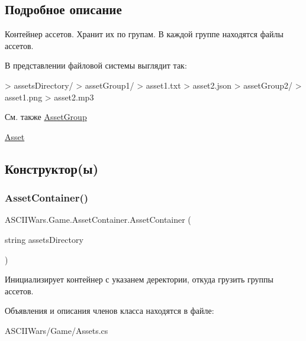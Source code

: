 \subsection{Подробное описание}
Контейнер ассетов. Хранит их по групам. В каждой группе находятся файлы ассетов. 

В представлении файловой системы выглядит так\+: 
\begin{DoxyCode}
> assetsDirectory/
>     assetGroup1/
>         asset1.txt
>         asset2.json
>     assetGroup2/
>         asset1.png
>         asset2.mp3
\end{DoxyCode}


\begin{DoxySeeAlso}{См. также}
\hyperlink{class_a_s_c_i_i_wars_1_1_game_1_1_asset_group}{Asset\+Group} 

\hyperlink{class_a_s_c_i_i_wars_1_1_game_1_1_asset}{Asset} 
\end{DoxySeeAlso}


\subsection{Конструктор(ы)}
\hypertarget{class_a_s_c_i_i_wars_1_1_game_1_1_asset_container_afb55a3f711d67504b677fc2bc38718cc}{}\label{class_a_s_c_i_i_wars_1_1_game_1_1_asset_container_afb55a3f711d67504b677fc2bc38718cc} 
\subsubsection{\texorpdfstring{Asset\+Container()}{AssetContainer()}}
{\footnotesize\ttfamily A\+S\+C\+I\+I\+Wars.\+Game.\+Asset\+Container.\+Asset\+Container (\begin{DoxyParamCaption}\item[{string}]{assets\+Directory }\end{DoxyParamCaption})\hspace{0.3cm}{\ttfamily [inline]}}

Инициализирует контейнер с указанем деректории, откуда грузить группы ассетов. 

Объявления и описания членов класса находятся в файле\+:\begin{DoxyCompactItemize}
\item 
A\+S\+C\+I\+I\+Wars/\+Game/Assets.\+cs\end{DoxyCompactItemize}
